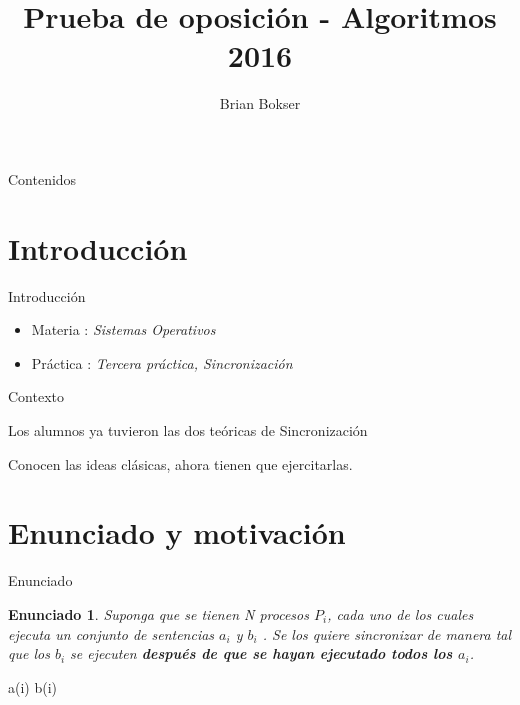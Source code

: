 \documentclass[pdf]{beamer}
\title[Prueba de oposición] %
{Prueba de oposición - Algoritmos 2016}
\author[Brian Bokser] %
{Brian Bokser}
\institute[UBA-FCEN] %
{
  Facultad de Ciencias Exactas y Naturales\\
  Universidad de Buenos Aires
}
\newtheorem{enun}{Enunciado}
\begin{document}
\begin{frame}
  \titlepage
\end{frame}

\begin{frame}{Contenidos}
  \tableofcontents
\end{frame}



\section{Introducci\'on}

\begin{frame}{Introducci\'on}
    \begin{itemize}
	\item Materia :  \emph{Sistemas Operativos}
	\vspace{2em}
	\item Práctica : \emph{Tercera práctica, Sincronización}

    \end{itemize}

\end{frame}

\begin{frame}{Contexto}
    \par{Los alumnos ya tuvieron las dos teóricas de Sincronización }
    \vspace{2em}
	
    \par{Conocen las ideas clásicas, ahora tienen que ejercitarlas.}
    \vspace{2em}
	
\end{frame}

\section{Enunciado y motivación}

\begin{frame}{Enunciado}

\begin{enun}
    Suponga que se tienen N procesos $P_i$, cada uno de los cuales ejecuta un conjunto de sentencias $a_i$
y $b_i$ . Se los quiere sincronizar de manera tal que los $b_i$ se ejecuten \textbf{después de que se hayan ejecutado
todos los $a_i$}.

\end{enun}

\pause

\begin{algorithmic}

     
        \State a(i)
        \vspace{1em}
        \State b(i)
        \vspace{1em}
        
    \EndFunction
\end{algorithmic}
    

\end{frame}
\end{document}
